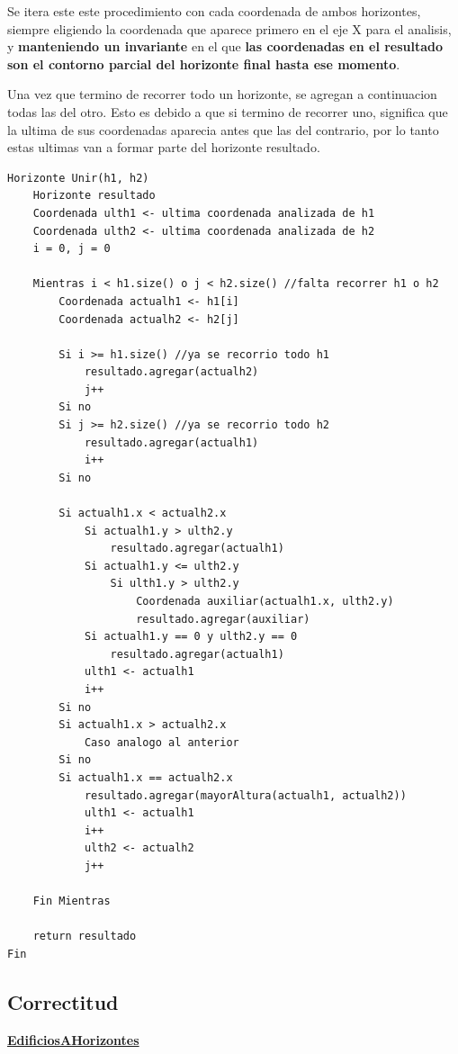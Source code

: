 \documentclass[10pt,a4paper]{article}
\begin{document}
Se itera este este procedimiento con cada coordenada de ambos horizontes, siempre eligiendo la coordenada que aparece primero en el eje X para el analisis, y \textbf{manteniendo un invariante} en el que \textbf{las coordenadas en el resultado son el contorno parcial del horizonte final hasta ese momento}.

Una vez que termino de recorrer todo un horizonte, se agregan a continuacion todas las del otro. Esto es debido a que si termino de recorrer uno, significa que la ultima de sus coordenadas aparecia antes que las del contrario, por lo tanto estas ultimas van a formar parte del horizonte resultado.
\bigskip
\begin{lstlisting}
Horizonte Unir(h1, h2)
	Horizonte resultado
	Coordenada ulth1 <- ultima coordenada analizada de h1
	Coordenada ulth2 <- ultima coordenada analizada de h2
	i = 0, j = 0

	Mientras i < h1.size() o j < h2.size() //falta recorrer h1 o h2
		Coordenada actualh1 <- h1[i]
		Coordenada actualh2 <- h2[j]
		
		Si i >= h1.size() //ya se recorrio todo h1
			resultado.agregar(actualh2)
			j++
		Si no
		Si j >= h2.size() //ya se recorrio todo h2
			resultado.agregar(actualh1)
			i++
		Si no
		
		Si actualh1.x < actualh2.x
			Si actualh1.y > ulth2.y
				resultado.agregar(actualh1)
			Si actualh1.y <= ulth2.y
				Si ulth1.y > ulth2.y
					Coordenada auxiliar(actualh1.x, ulth2.y)
					resultado.agregar(auxiliar)
			Si actualh1.y == 0 y ulth2.y == 0
				resultado.agregar(actualh1)
			ulth1 <- actualh1
			i++
		Si no		
		Si actualh1.x > actualh2.x
			Caso analogo al anterior
		Si no		
		Si actualh1.x == actualh2.x
			resultado.agregar(mayorAltura(actualh1, actualh2))
			ulth1 <- actualh1
			i++
			ulth2 <- actualh2
			j++
			
	Fin Mientras
	
	return resultado
Fin	
\end{lstlisting}


\newpage
\subsection{Correctitud}

\noindent \underline{\textbf{EdificiosAHorizontes}}
\end{document}
